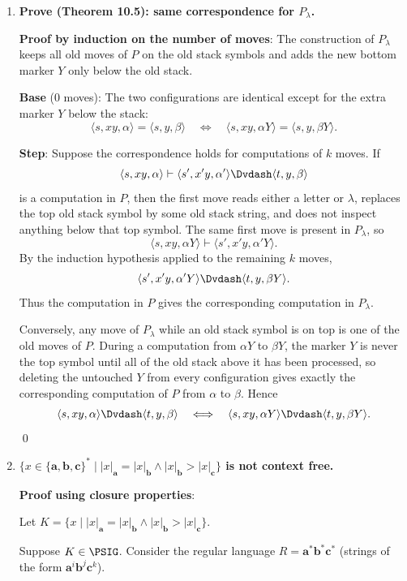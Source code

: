 \begin{enumerate}[{10.}1. ]
\item \textbf{Prove (Theorem 10.5): same correspondence for $P_\lambda$.}

\textbf{Proof by induction on the number of moves}: The construction of
$P_\lambda$ keeps all old moves of $P$ on the old stack symbols and adds the
new bottom marker $Y$ only below the old stack.

\textbf{Base} (0 moves): The two configurations are identical except for the
extra marker $Y$ below the stack:
\[
\langle s,xy,\alpha\rangle=\langle s,y,\beta\rangle
\quad\Longleftrightarrow\quad
\langle s,xy,\alpha Y\rangle=\langle s,y,\beta Y\rangle.
\]

\textbf{Step}: Suppose the correspondence holds for computations of $k$ moves.
If
\[
\langle s,xy,\alpha\rangle\vdash
\langle s',x'y,\alpha'\rangle\Dvdash
\langle t,y,\beta\rangle
\]
is a computation in $P$, then the first move reads either a letter or
$\lambda$, replaces the top old stack symbol by some old stack string, and
does not inspect anything below that top symbol. The same first move is present
in $P_\lambda$, so
\[
\langle s,xy,\alpha Y\rangle\vdash
\langle s',x'y,\alpha'Y\rangle.
\]
By the induction hypothesis applied to the remaining $k$ moves,
\[
\langle s',x'y,\alpha'Y\rangle\Dvdash
\langle t,y,\beta Y\rangle.
\]
Thus the computation in $P$ gives the corresponding computation in
$P_\lambda$.

Conversely, any move of $P_\lambda$ while an old stack symbol is on top is one
of the old moves of $P$. During a computation from $\alpha Y$ to $\beta Y$, the
marker $Y$ is never the top symbol until all of the old stack above it has been
processed, so deleting the untouched $Y$ from every configuration gives exactly
the corresponding computation of $P$ from $\alpha$ to $\beta$. Hence
\[
\langle s,xy,\alpha\rangle\Dvdash\langle t,y,\beta\rangle
\quad\Longleftrightarrow\quad
\langle s,xy,\alpha Y\rangle\Dvdash
\langle t,y,\beta Y\rangle.
\]
\qed

\item \textbf{$\{x\in\{\pmb{a},\pmb{b},\pmb{c}\}^* \mid |x|_{\pmb{a}}=|x|_{\pmb{b}}\wedge|x|_{\pmb{b}}>|x|_{\pmb{c}}\}$ is not context free.}

\textbf{Proof using closure properties}:

Let $K = \{x \mid |x|_{\pmb{a}}=|x|_{\pmb{b}}\wedge|x|_{\pmb{b}}>|x|_{\pmb{c}}\}$.

Suppose $K \in \PSIG$. Consider the regular language $R = \pmb{a}^*\pmb{b}^*\pmb{c}^*$ (strings of the form $\pmb{a}^i\pmb{b}^j\pmb{c}^k$).


\end{enumerate}
